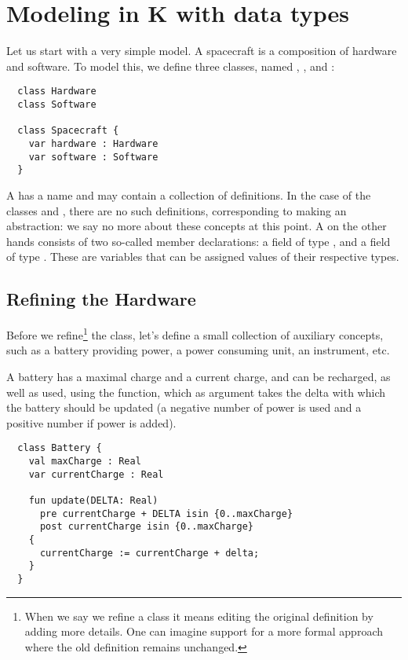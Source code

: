 
\section{Modeling in K with data types}
\label{sec:datatypes}

Let us start with a very simple model. A spacecraft is a composition of hardware and software. To model this, we define three classes, named , , and 
:

\sk
\begin{lstlisting}
  class Hardware
  class Software

  class Spacecraft {
    var hardware : Hardware
    var software : Software
  }
\end{lstlisting}

\noindent
A  has a name and may contain a collection
of definitions. In the case of the classes  and , there are no such definitions, corresponding to 
making an abstraction: we say no more about these concepts at this point. A  on the other hands consists of two so-called
member declarations: a  field of type ,
and a  field of type .
These are variables that can be assigned values of their respective types.

\subsection{Refining the Hardware}

Before we refine\footnote{When we say we refine a class it means editing the original definition by 
adding more details. One can imagine support for a more formal approach where the old definition remains unchanged.} the
 class, let's define a small collection of auxiliary concepts, such as a battery providing power, a power consuming unit,
an instrument, etc. 

A battery has a maximal charge and a current charge, and can
be recharged, as well as used, using the  function, which as argument takes the delta with which the battery should be updated (a negative number of power is used and a positive number
if power is added).

\sk
\begin{lstlisting}
  class Battery {
    val maxCharge : Real
    var currentCharge : Real

    fun update(DELTA: Real) 
      pre currentCharge + DELTA isin {0..maxCharge}
      post currentCharge isin {0..maxCharge}
    {
      currentCharge := currentCharge + delta;
    }
  }
\end{lstlisting}

